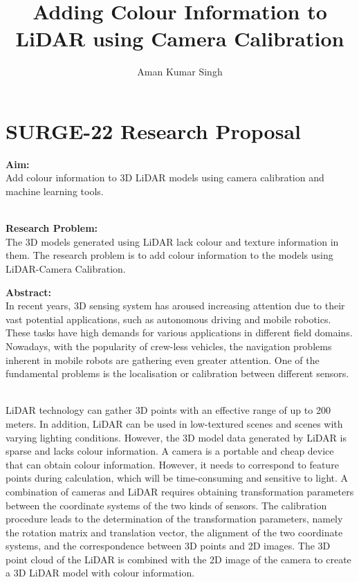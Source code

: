 \documentclass[11pt]{extarticle}
\begin{document}
\large{\title{ Adding Colour Information to LiDAR using Camera Calibration}}
\author{Aman Kumar Singh}
\date{}

\maketitle
\large{
\section*{SURGE-22 Research Proposal}
\vspace{4mm}


\textbf{Aim:}
\\Add colour information to 3D LiDAR models using camera calibration and machine learning tools.
\vspace{2mm}


\hspace{-5mm}\\\textbf{Research Problem:}
\justifying\\The 3D models generated using LiDAR lack colour and texture information in them. The research problem is to add colour information to the models using LiDAR-Camera Calibration.
\vspace{2mm}


\hspace{-5mm}\textbf{Abstract:}
\justifying\\In recent years, 3D sensing system has aroused increasing attention due to their vast potential applications, such as autonomous driving and mobile robotics. These tasks have high demands for various applications in different field domains. Nowadays, with the popularity of crew-less vehicles, the navigation problems inherent in mobile robots are gathering even greater attention. One of the fundamental problems is the localisation or calibration between different sensors. 

\justifying\\LiDAR technology can gather 3D points with an effective range of up to 200 meters. In addition, LiDAR can be used in low-textured scenes and scenes with varying lighting conditions. However, the 3D model data generated by LiDAR is sparse and lacks colour information. A camera is a portable and cheap device that can obtain colour information. However, it needs to correspond to feature points during calculation, which will be time-consuming and sensitive to light. A combination of cameras and LiDAR requires obtaining transformation parameters between the coordinate systems of the two kinds of sensors. The calibration procedure leads to the determination of the transformation parameters, namely the rotation matrix and translation vector, the alignment of the two coordinate systems, and the correspondence between 3D points and 2D images. The 3D point cloud of the LiDAR is combined with the 2D image of the camera to create a 3D LiDAR model with colour information.
\vspace{2mm}


}
\end{document}
